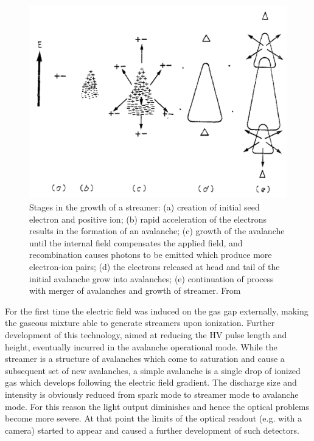 \begin{figure}[!t]
\begin{center}
\includegraphics[width=\linewidth]{Chapters/Performance/Figs/streamer.pdf}
\caption{Stages in the growth of a streamer: (a) creation of initial seed electron and positive ion; (b) rapid acceleration of the electrons results in the formation of an avalanche; (c) growth of the avalanche until the internal field compensates the applied field, and recombination causes photons to be emitted which produce more electron-ion pairs; (d) the electrons released at head and tail of the initial avalanche grow into avalanches; (e) continuation of process with merger of avalanches and growth of streamer. From \cite{evans:1969}}
\label{fig:Streamer}
\end{center}
\end{figure}

For the first time the electric field was induced on the gas gap externally, making the gaseous mixture able to generate streamers upon ionization.
Further development of this technology, aimed at reducing the HV pulse length and height, eventually incurred in the avalanche operational mode.
While the streamer is a structure of avalanches which come to saturation and cause a subsequent set of new avalanches, a simple avalanche is a single drop of ionized gas which develops following the electric field gradient.
The discharge size and intensity is obviously reduced from spark mode to streamer mode to avalanche mode.
For this reason the light output diminishes and hence the optical problems become more severe.
At that point the limits of the optical readout (e.g. with a camera) started to appear and caused a further development of such detectors.

